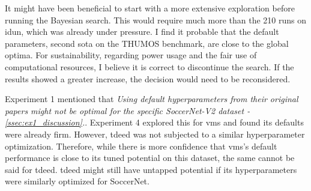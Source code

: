 It might have been beneficial to start with a more extensive exploration before running the Bayesian search. This would require much more than the 210 runs on \acrshort{idun}, which was already under pressure. I find it probable that the default parameters, second \acrshort{sota} on the THUMOS benchmark, are close to the global optima. For sustainability, regarding power usage and the fair use of computational resources, I believe it is correct to discontinue the search. If the results showed a greater increase, the decision would need to be reconsidered.


Experiment 1 mentioned that \textit{Using default hyperparameters from their original papers might not be optimal for the specific SoccerNet-V2 dataset - \cref{ssec:ex1_discussion}.}. Experiment 4 explored this for \acrshort{vms} and found its defaults were already firm. However, \acrshort{tdeed} was not subjected to a similar hyperparameter optimization. Therefore, while there is more confidence that \acrshort{vms}'s default performance is close to its tuned potential on this dataset, the same cannot be said for \acrshort{tdeed}. \acrshort{tdeed} might still have untapped potential if its hyperparameters were similarly optimized for SoccerNet.


